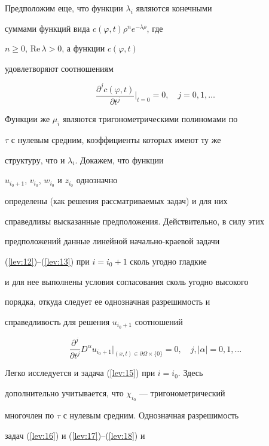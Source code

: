 Предположим еще, что функции $\lambda_i$ являются конечными


суммами функций вида $c(\varphi,t)\rho^n e^{-\lambda\rho}$, где


$n\geqslant 0$, $\mathrm{Re\,}\lambda>0$, а функции $c(\varphi,t)$


удовлетворяют соотношениям


\begin{equation}\label{lev:22}


\frac{\partial^j c(\varphi,t)}


{\partial t^j}\Big|_{t=0}=0,\quad j=0,1,\dotsc


\end{equation}


Функции же $\mu_i$ являются тригонометрическими полиномами по


$\tau$ с нулевым средним, коэффициенты которых имеют ту же


структуру, что и $\lambda_i$. Докажем, что функции


$u_{i_0+1}$, $v_{i_0}$, $w_{i_0}$ и $z_{i_0}$ однозначно


определены (как решения рассматриваемых задач) и для них


справедливы высказанные предположения. Действительно, в силу этих


предположений данные линейной начально-краевой задачи


(\ref{lev:12})--(\ref{lev:13}) при  $i=i_0+1$ сколь угодно гладкие


и для нее выполнены условия согласования сколь угодно высокого


порядка, откуда следует ее однозначная разрешимость и


справедливость для решения $u_{i_0+1}$ соотношений


$$


\frac{\partial^j}{\partial t^j} D^\alpha u_{i_0+1}


\Big|_{(x,t)\in \partial\Omega\times\{0\}}=0,\quad


j,|\alpha|=0,1,\dotsc


$$


Легко исследуется и задача (\ref{lev:15}) при $i=i_0$. Здесь


дополнительно учитывается, что $\chi_{i_0}$ --- тригонометрический


многочлен по $\tau$ с нулевым средним. Однозначная разрешимость


задач (\ref{lev:16}) и (\ref{lev:17})--(\ref{lev:18}) и


